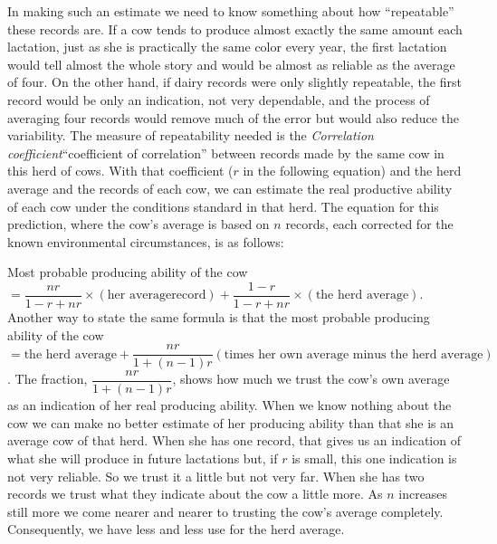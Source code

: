 In making such an estimate we need to know something about how
``repeatable'' these records are. If a cow tends to produce almost exactly
the same amount each lactation, just as she is practically the same color
every year, the first lactation would tell almost the whole story and
would be almost as reliable as the average of four. On the other hand, if
dairy records were only slightly repeatable, the first record would be
only an indication, not very dependable, and the process of averaging
four records would remove much of the error but would also reduce the
variability. The measure of repeatability needed is the \textit{Correlation coefficient}``coefficient of
correlation'' between records made by the same cow in this herd of
cows. With that coefficient ($r$ in the following equation) and the herd
average and the records of each cow, we can estimate the real productive
ability of each cow under the conditions standard in that herd. The
equation for this prediction, where the cow's average is based on $n$
records, each corrected for the known environmental circumstances, is
as follows:

Most probable producing ability of the cow \(= \dfrac{nr}{1 - r + nr} \times (
\textrm{her average}\allowbreak\textrm{record}) + \dfrac{1 - r}{1 - r + nr} \times (\textrm{the
herd average})\). Another way to state the same formula is that the most probable 
producing ability of the cow \(= \textrm{the herd average} + \dfrac{nr}{1 +
(n - 1)r} \allowbreak(\textrm{times her own average minus the herd average})\).
The fraction, \(\allowbreak\dfrac{nr}{1 + (n - 1)r}\), shows how much
we trust the cow's own average as an indication of her real producing
ability. When we know nothing about the cow we can make no better
estimate of her producing ability than that she is an average cow of that
herd. When she has one record, that gives us an indication of what she
will produce in future lactations but, if $r$ is small, this one indication is
not very reliable. So we trust it a little but not very far. When she has
two records we trust what they indicate about the cow a little more. As
$n$ increases still more we come nearer and nearer to trusting the cow's
average completely. Consequently, we have less and less use for the herd
average.

